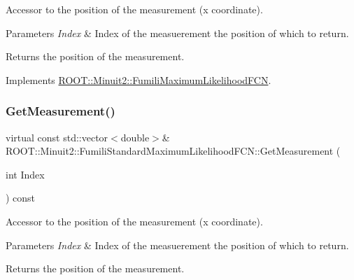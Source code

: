 Accessor to the position of the measurement (x coordinate).


\begin{DoxyParams}{Parameters}
{\em Index} & Index of the measuerement the position of which to return.\\
\hline
\end{DoxyParams}
\begin{DoxyReturn}{Returns}
the position of the measurement. 
\end{DoxyReturn}


Implements \mbox{\hyperlink{classROOT_1_1Minuit2_1_1FumiliMaximumLikelihoodFCN_ac3e28c8d3e14a1df3145891ae99ac35d}{R\+O\+O\+T\+::\+Minuit2\+::\+Fumili\+Maximum\+Likelihood\+F\+CN}}.

\mbox{\label{classROOT_1_1Minuit2_1_1FumiliStandardMaximumLikelihoodFCN_a942bb66ec7d48d9ec0ea3d883dff7378}} 
\subsubsection{\texorpdfstring{GetMeasurement()}{GetMeasurement()}\hspace{0.1cm}{\footnotesize\ttfamily [2/3]}}
{\footnotesize\ttfamily virtual const std\+::vector$<$double$>$\& R\+O\+O\+T\+::\+Minuit2\+::\+Fumili\+Standard\+Maximum\+Likelihood\+F\+C\+N\+::\+Get\+Measurement (\begin{DoxyParamCaption}\item[{int}]{Index }\end{DoxyParamCaption}) const\hspace{0.3cm}{\ttfamily [virtual]}}

Accessor to the position of the measurement (x coordinate).


\begin{DoxyParams}{Parameters}
{\em Index} & Index of the measuerement the position of which to return.\\
\hline
\end{DoxyParams}
\begin{DoxyReturn}{Returns}
the position of the measurement. 
\end{DoxyReturn}


